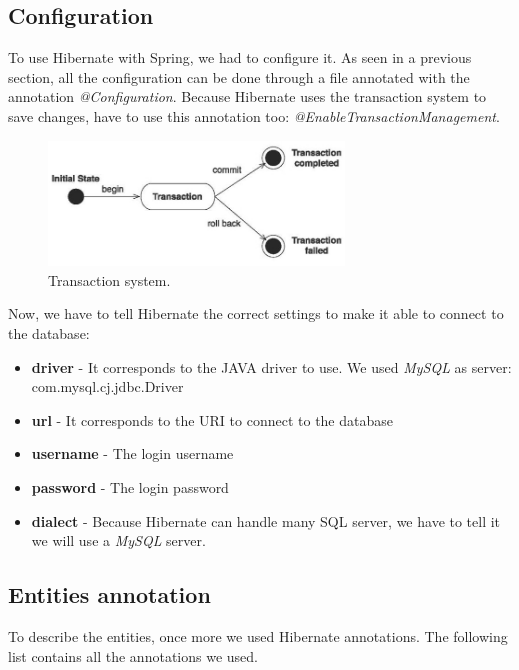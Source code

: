 \subsection{Configuration}
To use Hibernate with Spring, we had to configure it. As seen in a previous section, all the configuration can be done through a file annotated with the annotation \textit{@Configuration}. 
Because Hibernate uses the transaction system to save changes, have to use this annotation too: \textit{@EnableTransactionManagement}.


\begin{figure}[!ht]
  \caption{Transaction system.}
  \centering
    \includegraphics[width=0.7\textwidth]{img/transaction.jpg}
\end{figure}


Now, we have to tell Hibernate the correct settings to make it able to connect to the database:
\begin{itemize}
	\item \textbf{driver} - It corresponds to the JAVA driver to use. We used \textit{MySQL} as server: com.mysql.cj.jdbc.Driver
	\item \textbf{url} - It corresponds to the URI to connect to the database
	\item \textbf{username} - The login username
	\item \textbf{password} - The login password
	\item \textbf{dialect} - Because Hibernate can handle many SQL server, we have to tell it we will use a \textit{MySQL} server. 
\end{itemize}

\subsection{Entities annotation}
To describe the entities, once more we used Hibernate annotations. The following list contains all the annotations we used.

